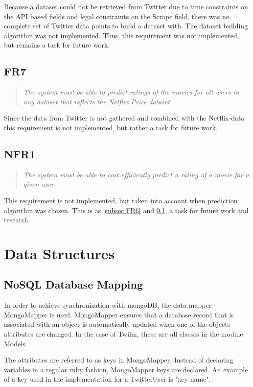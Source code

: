 Because a dataset could not be retrieved from Twitter due to time constraints on the API based fields and legal constraints on the Scrape field, there was no complete set of Twitter data points to build a dataset with. The dataset building algorithm was not implemented. Thus, this requirement was not implemented, but remains a task for future work.

\subsection{FR7}\label{subsec:FR7}
\begin{quotation}
\em The system must be able to predict ratings of the movies for all users in any dataset that reflects the Netflix Prize dataset %
\end{quotation}

Since the data from Twitter is not gathered and combined with the Netflix-data this requirement is not implemented, but rather a task for future work.

\subsection{NFR1}
\begin{quotation}
\em The system must be able to cost efficiently predict a rating of a movie for a given user %
\end{quotation}

This requirement is not implemented, but taken into account when prediction algorithm was chosen. This is as \ref{subsec:FR6} and \ref{subsec:FR7}, a task for future work and research.


\section{Data Structures}\label{impl:Data structures}
\subsection{NoSQL Database Mapping}
In order to achieve synchronization with mongoDB, the data mapper MongoMapper is used. MongoMapper ensures that a database record that is associated with an object is automatically updated when one of the objects attributes are changed. In the case of Twilm, these are all classes in the module Models.

The attributes are referred to as keys in MongoMapper. Instead of declaring variables in a regular ruby fashion, MongoMapper keys are declared. An example of a key used in the implementation for a TwitterUser is "key name".

